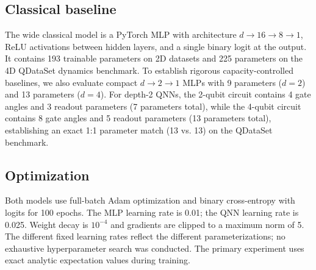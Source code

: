 \subsection{Classical baseline}
The wide classical model is a PyTorch MLP with architecture $d\rightarrow16\rightarrow8\rightarrow1$, ReLU activations between hidden layers, and a single binary logit at the output. It contains 193 trainable parameters on 2D datasets and 225 parameters on the 4D QDataSet dynamics benchmark. To establish rigorous capacity-controlled baselines, we also evaluate compact $d\rightarrow2\rightarrow1$ MLPs with 9 parameters ($d=2$) and 13 parameters ($d=4$). For depth-2 QNNs, the 2-qubit circuit contains 4 gate angles and 3 readout parameters (7 parameters total), while the 4-qubit circuit contains 8 gate angles and 5 readout parameters (13 parameters total), establishing an exact 1:1 parameter match (13 vs. 13) on the QDataSet benchmark.

\subsection{Optimization}
Both models use full-batch Adam optimization and binary cross-entropy with logits for 100 epochs. The MLP learning rate is 0.01; the QNN learning rate is 0.025. Weight decay is $10^{-4}$ and gradients are clipped to a maximum norm of 5. The different fixed learning rates reflect the different parameterizations; no exhaustive hyperparameter search was conducted. The primary experiment uses exact analytic expectation values during training.
